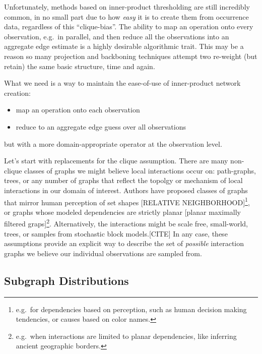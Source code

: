 \documentclass[%
	12pt,
		oneside,
		letterpaper
]{book}
\providecommand{\tightlist}{%
  \setlength{\itemsep}{0pt}\setlength{\parskip}{0pt}}\usepackage{longtable,booktabs,array}
\begin{document}
Unfortunately, methods based on inner-product thresholding are still
incredibly common, in no small part due to how \emph{easy} it is to
create them from occurrence data, regardless of this ``clique-bias''.
The ability to map an operation onto every observation, e.g.~in
parallel, and then reduce all the observations into an aggregate edge
estimate is a highly desirable algorithmic trait. This may be a reason
so many projection and backboning techniques attempt two re-weight (but
retain) the same basic structure, time and again.

What we need is a way to maintain the ease-of-use of inner-product
network creation:

\begin{itemize}
\tightlist
\item
  map an operation onto each observation
\item
  reduce to an aggregate edge guess over all observations
\end{itemize}

but with a more domain-appropriate operator at the observation level.

Let's start with replacements for the clique assumption. There are many
non-clique classes of graphs we might believe local interactions occur
on: path-graphs, trees, or any number of graphs that reflect the topolgy
or mechanism of local interactions in our domain of interest. Authors
have proposed classes of graphs that mirror human perception of set
shapes {[}RELATIVE NEIGHBORHOOD{]}\footnote{ e.g.~for dependencies based
  on perception, such as human decision making tendencies, or causes
  based on color names.}, or graphs whose modeled dependencies are
strictly planar {[}planar maximally filtered graps{]}\footnote{
  e.g.~when interactions are limited to planar dependencies, like
  inferring ancient geographic borders.}. Alternatively, the
interactions might be scale free, small-world, trees, or samples from
stochastic block models.{[}CITE{]} In any case, these assumptions
provide an explicit way to describe the set of \emph{possible}
interaction graphs we believe our individual observations are sampled
from.

\subsection{Subgraph Distributions}\label{sec-subgraph-dists}
\end{document}
